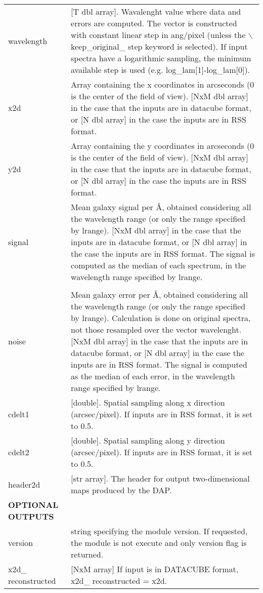 \begin{center}
\begin{longtable}{p{2.7cm}| p{11.1cm}}
%
wavelength     & [T dbl array]. Wavalenght value where data and errors are computed. The vector is constructed with constant linear step in ang/pixel 
               (unless the $\backslash$keep\_original\_ step keyword is selected). If input spectra have a logarithmic sampling, 
               the minimum available step is used (e.g. log\_lam[1]-log\_lam[0]).   \\
%
x2d            & Array containing the x coordinates in arcseconds (0 is the center of the field of view). 
               [NxM dbl array] in the case that the inputs are in datacube format, or 
               [N dbl array] in the case the inputs are in RSS format. \\
%
y2d            & Array containing the y coordinates in arcseconds (0 is the center of the field of view). 
               [NxM dbl array] in the case that the inputs are in datacube format, or 
               [N dbl array] in the case the inputs are in RSS format. \\
%
signal         & Mean galaxy signal per \AA, obtained considering all the wavelength range 
               (or only the range specified by lrange).               
               [NxM dbl array] in the case that the inputs are in datacube format, or 
               [N dbl array] in the case the inputs are in RSS format. 
               The signal is computed as the median of each spectrum, in the wavelength range specified by lrange. \\
\\
%
noise          & Mean galaxy error per \AA, obtained considering all the wavelength range 
               (or only the range specified by lrange). Calculation is done on original spectra, not those resampled over the vector wavelenght.
               [NxM dbl array] in the case that the inputs are in datacube format, or 
               [N dbl array] in the case the inputs are in RSS format.
               The signal is computed as the median of each error, in the wavelength range specified by lrange.\\
%               
cdelt1         & [double].        Spatial sampling along x direction (arcsec/pixel). If inputs are in RSS format, it is set to 0.5.  \\
cdelt2         & [double].        Spatial sampling along y direction (arcsec/pixel). If inputs are in RSS format, it is set to 0.5.  \\
header2d       & [str array].     The header for output two-dimensional maps produced by the DAP. \\
\hline
{\bf  OPTIONAL OUTPUTS} &  \\
\hline
version & string specifying the module version. If requested, the module is not execute and only version flag is returned.\\
 x2d\_ reconstructed  &   [NxM array]   If input is in DATACUBE format, x2d\_ reconstructed = x2d.


\end{longtable}
\end{center}
